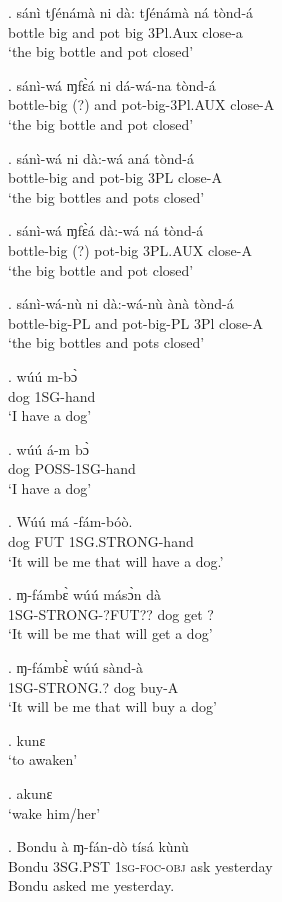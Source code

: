 \documentclass{assets/fieldnotes}
\begin{document}
\exg. sánì tʃénámà ni dà: tʃénámà ná tònd-á\\
     bottle big   and pot big   3Pl.Aux close-a\\
`the big bottle and pot  closed'

\exg. sánì-wá ɱfɛ̀á ni dá-wá-na tònd-á\\
bottle-big   (?)  and pot-big-3Pl.AUX close-A\\
`the big bottle and pot  closed'

\exg. sánì-wá ni dà:-wá aná tònd-á\\
bottle-big and pot-big 3PL close-A\\
`the big bottles and pots closed' 

\exg. sánì-wá ɱfɛ̀á dà:-wá ná tònd-á\\
bottle-big   (?) pot-big 3PL.AUX close-A\\
`the big bottle and pot closed' 

\ex. sánì-wá-nù ni dà:-wá-nù ànà tònd-á\\
bottle-big-PL and pot-big-PL 3Pl close-A\\
`the big bottles and pots closed'

\exg. wúú m-bɔ̀\\
dog 1SG-hand\\
`I have a dog'

\exg. wúú á-m bɔ̀\\
dog POSS-1SG-hand\\
`I have a dog'

\exg. W\'{u}\'{u} m\'{a} -f\'{a}m-b\'{o}\`{o}. \\
dog FUT 1SG.STRONG-hand \\
`It will be me that will have a dog.' 

\exg. ɱ-fámbɛ̀ wúú másɔ̀n dà\\
1SG-STRONG-?FUT?? dog get  ?\\
`It will be me that will get a dog'

\exg. ɱ-fámbɛ̀ wúú sànd-à\\
1SG-STRONG.? dog buy-A\\
`It will be me that will buy a dog'

\ex. kunɛ\\
`to awaken'

\ex. akunɛ\\
`wake him/her'

\exg. Bondu à ɱ-fán-dò tísá kùnù\\
Bondu \textsc{3SG.PST} 1\textsc{sg}-\textsc{foc}-\textsc{obj} ask yesterday\\
Bondu asked me yesterday.
\end{document}
